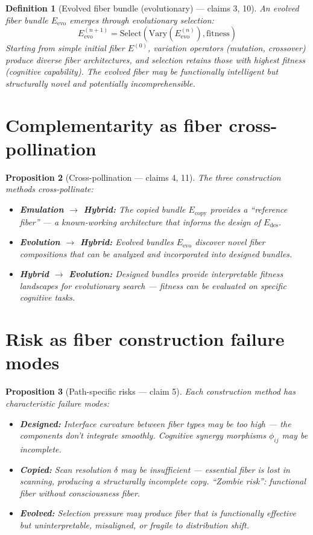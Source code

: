 \documentclass[11pt,a4paper]{article}
\newtheorem{definition}{Definition}[section]
\newtheorem{proposition}[definition]{Proposition}
\begin{document}
\begin{definition}[Evolved fiber bundle (evolutionary) --- claims 3, 10]
An \emph{evolved fiber bundle} $E_{\text{evo}}$ emerges through
evolutionary selection:
\[
  E_{\text{evo}}^{(n+1)} = \text{Select}\left(
    \text{Vary}(E_{\text{evo}}^{(n)}), \text{fitness}\right)
\]
Starting from simple initial fiber $E^{(0)}$, variation operators
(mutation, crossover) produce diverse fiber architectures, and selection
retains those with highest fitness (cognitive capability). The evolved
fiber may be functionally intelligent but structurally novel and
potentially incomprehensible.
\end{definition}

\section{Complementarity as fiber cross-pollination}

\begin{proposition}[Cross-pollination --- claims 4, 11]
\label{prop:cross}
The three construction methods cross-pollinate:
\begin{itemize}
  \item \textbf{Emulation $\to$ Hybrid:} The copied bundle $E_{\text{copy}}$
    provides a ``reference fiber'' --- a known-working architecture that
    informs the design of $E_{\text{des}}$.
  \item \textbf{Evolution $\to$ Hybrid:} Evolved bundles $E_{\text{evo}}$
    discover novel fiber compositions that can be analyzed and incorporated
    into designed bundles.
  \item \textbf{Hybrid $\to$ Evolution:} Designed bundles provide
    interpretable fitness landscapes for evolutionary search --- fitness
    can be evaluated on specific cognitive tasks.
\end{itemize}
\end{proposition}

\section{Risk as fiber construction failure modes}

\begin{proposition}[Path-specific risks --- claim 5]
\label{prop:risks}
Each construction method has characteristic failure modes:
\begin{itemize}
  \item \textbf{Designed:} Interface curvature between fiber types may be
    too high --- the components don't integrate smoothly. Cognitive synergy
    morphisms $\phi_{ij}$ may be incomplete.
  \item \textbf{Copied:} Scan resolution $\delta$ may be insufficient ---
    essential fiber is lost in scanning, producing a structurally incomplete
    copy. ``Zombie risk'': functional fiber without consciousness fiber.
  \item \textbf{Evolved:} Selection pressure may produce fiber that is
    functionally effective but uninterpretable, misaligned, or fragile to
    distribution shift.
\end{itemize}
\end{proposition}
\end{document}
